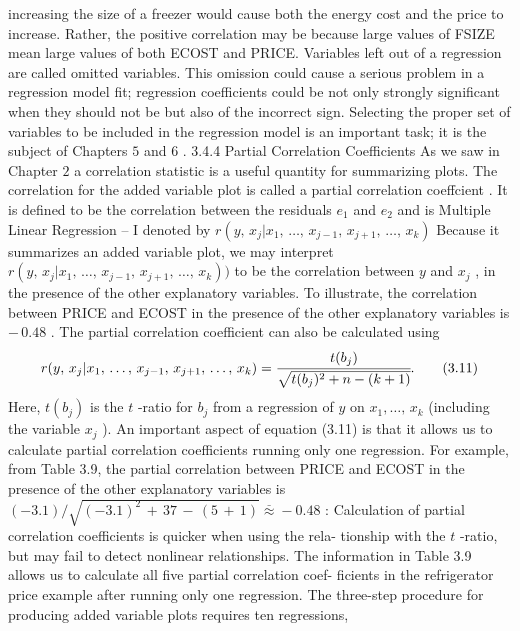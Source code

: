 \documentclass[11pt]{article}
\begin{document}
 increasing the size of a freezer would cause both the energy cost and the price to
 increase. Rather, the positive correlation may be because large values of FSIZE
 mean large values of both ECOST and PRICE.
Variables left out of a regression are called omitted variables. This omission
could cause a serious problem in a regression model fit; regression coefficients
could be not only strongly significant when they should not be but also of the
 incorrect sign. Selecting the proper set of variables to be included in the regression
model is an important task; it is the subject of Chapters \(5\) and \(6\) .
 3.4.4 Partial Correlation Coefficients
 As we saw in Chapter \(2\) a correlation statistic is a useful quantity for summarizing
 plots. The correlation for the added variable plot is called a partial correlation
coeffcient . It is defined to be the correlation between the residuals \(e_{1}\) and \(e_{2}\) and is
 Multiple Linear Regression -- I
 denoted by \(r ( y , \, x_{j} | x_{1} , \, \ldots, \, x_{j-1} , \, x_{j+1} , \, \ldots, \, x_{k} )\) Because it summarizes an added
variable plot, we may interpret \(r ( y , \, x_{j} | x_{1} , \, \ldots, \, x_{j-1} , \, x_{j+1} , \, \ldots, \, x_{k} ) )\) to be the
 correlation between \(y\) and \(x_{j}\) , in the presence of the other explanatory variables.
To illustrate, the correlation between PRICE and ECOST in the presence of the
 other explanatory variables is \(- \, 0 . 4 8\) .
 The partial correlation coefficient can also be calculated using
\[
r ( y , \, x_{j} | x_{1} , \, \dots, \, x_{j-1} , \, x_{j+1} , \, \dots, \, x_{k} )=\cfrac{t ( b_{j} )} {\sqrt{t ( b_{j} )^{2}+n-( k+1 )}} . \tag{3.11}
\]
Here, \(t ( b_{j} )\) is the \(t\) -ratio for \(b_{j}\) from a regression of \(y\) on \(x_{1} , \dots, \, x_{k}\) (including the
variable \(x_{j}\) ). An important aspect of equation (3.11) is that it allows us to calculate
partial correlation coefficients running only one regression. For example, from
 Table 3.9, the partial correlation between PRICE and ECOST in the presence of
 the other explanatory variables is \((-3 . 1 ) / \sqrt{(-3 . 1 )^{2} \,+\, 3 7 \,-\, ( 5 \,+\, 1 )} \stackrel{\_} \approx-0 . 4 8\) :
Calculation of partial correlation coefficients is quicker when using the rela-
tionship with the \(t\) -ratio, but may fail to detect nonlinear relationships. The
 information in Table 3.9 allows us to calculate all five partial correlation coef-
ficients in the refrigerator price example after running only one regression. The
 three-step procedure for producing added variable plots requires ten regressions,
\end{document}
